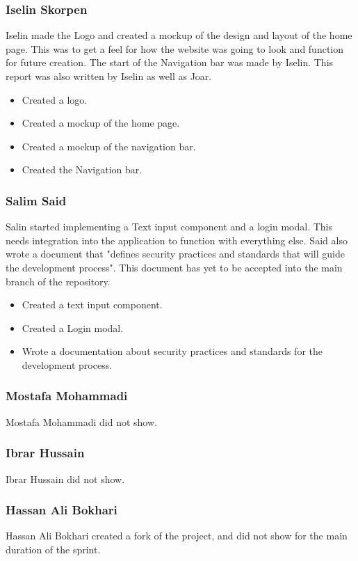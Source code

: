 \documentclass[12pt]{article}
\begin{document}
\subsubsection{Iselin Skorpen}
Iselin made the Logo and created a mockup of the design and layout of the home page. This was to get a feel for how the website was 
going to look and function for future creation. The start of the Navigation bar was made by Iselin. This report was also written by 
Iselin as well as Joar.
    \begin{itemize}
        \item Created a logo.
        \item Created a mockup of the home page.
        \item Created a mockup of the navigation bar.
        \item Created the Navigation bar.
    \end{itemize}
\subsubsection{Salim Said}
Salin started implementing a Text input component and a login modal. This needs integration into the application to function with everything 
else. Said also wrote a document that "defines security practices and standards that will guide the development process"\cite*{ShowitDocsSecurity}. 
This document has yet to be accepted into the main branch of the repository.
    \begin{itemize}
        \item Created a text input component.
        \item Created a Login modal.
        \item Wrote a documentation about security practices and standards for the development process.
    \end{itemize}
\subsubsection{Mostafa Mohammadi}
Mostafa Mohammadi did not show.
\subsubsection{Ibrar Hussain}
Ibrar Hussain did not show.
\subsubsection{Hassan Ali Bokhari}
Hassan Ali Bokhari created a fork of the project, and did not show for the main duration of the sprint.
\end{document}
